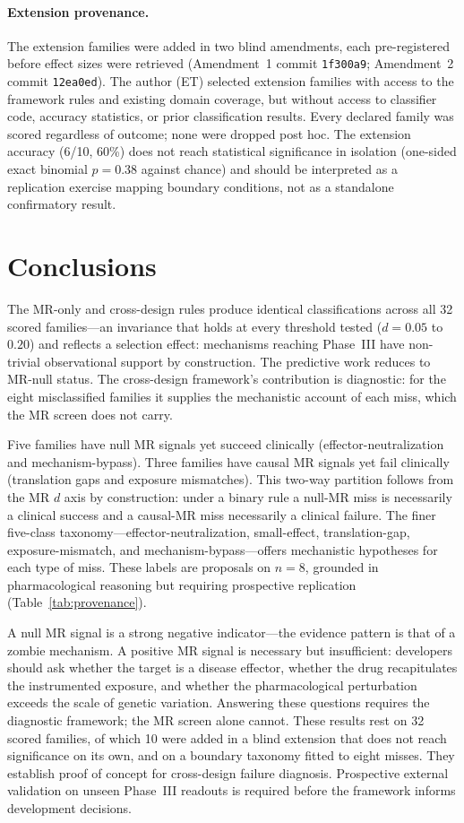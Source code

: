 \documentclass[11pt]{article}
\begin{document}
\paragraph{Extension provenance.} The extension families were added in two blind amendments, each pre-registered before effect sizes were retrieved (Amendment~1 commit \texttt{1f300a9}; Amendment~2 commit \texttt{12ea0ed}). The author (ET) selected extension families with access to the framework rules and existing domain coverage, but without access to classifier code, accuracy statistics, or prior classification results. Every declared family was scored regardless of outcome; none were dropped post hoc. The extension accuracy (6/10, 60\%) does not reach statistical significance in isolation (one-sided exact binomial $p = 0.38$ against chance) and should be interpreted as a replication exercise mapping boundary conditions, not as a standalone confirmatory result.

\section{Conclusions}

The MR-only and cross-design rules produce identical classifications across all 32 scored families---an invariance that holds at every threshold tested ($d = 0.05$ to $0.20$) and reflects a selection effect: mechanisms reaching Phase~III have non-trivial observational support by construction. The predictive work reduces to MR-null status. The cross-design framework's contribution is diagnostic: for the eight misclassified families it supplies the mechanistic account of each miss, which the MR screen does not carry.

Five families have null MR signals yet succeed clinically (effector-neutralization and mechanism-bypass). Three families have causal MR signals yet fail clinically (translation gaps and exposure mismatches). This two-way partition follows from the MR $d$ axis by construction: under a binary rule a null-MR miss is necessarily a clinical success and a causal-MR miss necessarily a clinical failure. The finer five-class taxonomy---effector-neutralization, small-effect, translation-gap, exposure-mismatch, and mechanism-bypass---offers mechanistic hypotheses for each type of miss. These labels are proposals on $n = 8$, grounded in pharmacological reasoning but requiring prospective replication (Table~\ref{tab:provenance}).

A null MR signal is a strong negative indicator---the evidence pattern is that of a zombie mechanism. A positive MR signal is necessary but insufficient: developers should ask whether the target is a disease effector, whether the drug recapitulates the instrumented exposure, and whether the pharmacological perturbation exceeds the scale of genetic variation. Answering these questions requires the diagnostic framework; the MR screen alone cannot. These results rest on 32 scored families, of which 10 were added in a blind extension that does not reach significance on its own, and on a boundary taxonomy fitted to eight misses. They establish proof of concept for cross-design failure diagnosis. Prospective external validation on unseen Phase~III readouts is required before the framework informs development decisions.
\end{document}

